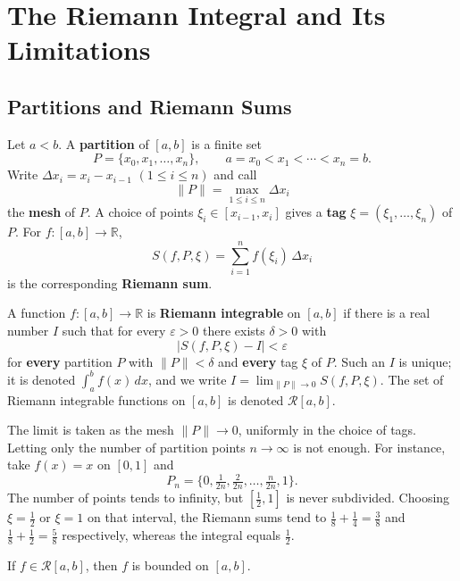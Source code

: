 \documentclass[11pt]{article}
\makeatletter
\newcommand{\envlabel}[1]{\protected@edef\@currentlabel{\themathenv}\label{#1}}
\makeatother
\begin{document}
\section{The Riemann Integral and Its Limitations}

\subsection{Partitions and Riemann Sums}

\begin{definition}
Let $a<b$. A \textbf{partition} of $[a,b]$ is a finite set
\[
P=\{x_{0},x_{1},\ldots,x_{n}\},\qquad a=x_{0}<x_{1}<\cdots<x_{n}=b.
\]
Write $\Delta x_{i}=x_{i}-x_{i-1}$ $(1\leq i\leq n)$ and call
\[
\|P\|=\max_{1\leq i\leq n}\Delta x_{i}
\]
the \textbf{mesh} of $P$. A choice of points $\xi_{i}\in[x_{i-1},x_{i}]$ gives a \textbf{tag} $\xi=(\xi_{1},\ldots,\xi_{n})$ of $P$. For $f:[a,b]\to\mathbb{R}$,
\[
S(f,P,\xi)=\sum_{i=1}^{n}f(\xi_{i})\,\Delta x_{i}
\]
is the corresponding \textbf{Riemann sum}.
\end{definition}

\begin{definition}
A function $f:[a,b]\to\mathbb{R}$ is \textbf{Riemann integrable} on $[a,b]$ if there is a real number $I$ such that for every $\varepsilon>0$ there exists $\delta>0$ with
\[
|S(f,P,\xi)-I|<\varepsilon
\]
for \textbf{every} partition $P$ with $\|P\|<\delta$ and \textbf{every} tag $\xi$ of $P$. Such an $I$ is unique; it is denoted $\displaystyle\int_{a}^{b}f(x)\,dx$, and we write $\displaystyle I=\lim_{\|P\|\to0}S(f,P,\xi)$. The set of Riemann integrable functions on $[a,b]$ is denoted $\mathcal{R}[a,b]$.
\end{definition}

\begin{remark}
The limit is taken as the mesh $\|P\|\to0$, uniformly in the choice of tags. Letting only the number of partition points $n\to\infty$ is not enough. For instance, take $f(x)=x$ on $[0,1]$ and
\[
P_{n}=\Big\{0,\tfrac{1}{2n},\tfrac{2}{2n},\ldots,\tfrac{n}{2n},1\Big\}.
\]
The number of points tends to infinity, but $[\tfrac12,1]$ is never subdivided. Choosing $\xi=\tfrac12$ or $\xi=1$ on that interval, the Riemann sums tend to $\tfrac18+\tfrac14=\tfrac38$ and $\tfrac18+\tfrac12=\tfrac58$ respectively, whereas the integral equals $\tfrac12$.
\end{remark}

\begin{proposition}\envlabel{en:prop:bdd}
If $f\in\mathcal{R}[a,b]$, then $f$ is bounded on $[a,b]$.
\end{proposition}
\end{document}
